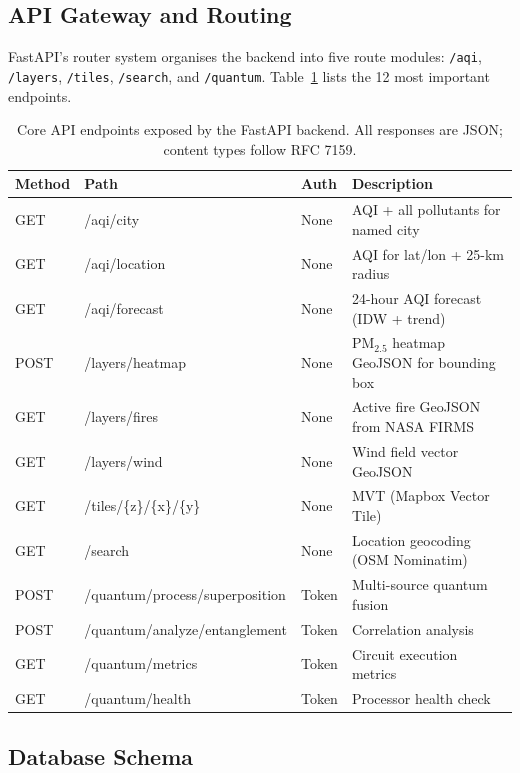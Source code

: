 \documentclass[12pt,a4paper]{article}
\begin{document}
\subsection{API Gateway and Routing}
\label{sec:sysdesign:gateway}

FastAPI's router system organises the backend into five route modules:
\texttt{/aqi}, \texttt{/layers}, \texttt{/tiles}, \texttt{/search}, and
\texttt{/quantum}. Table~\ref{tab:endpoints} lists the 12 most important
endpoints.

\begin{table}[H]
\centering
\caption[Core API endpoints]{Core API endpoints exposed by the FastAPI backend.
All responses are JSON; content types follow RFC 7159.}
\label{tab:endpoints}
\begin{tabular}{@{}lllp{5.5cm}@{}}
\toprule
\textbf{Method} & \textbf{Path} & \textbf{Auth} & \textbf{Description} \\
\midrule
GET  & /aqi/city      & None  & AQI + all pollutants for named city \\
GET  & /aqi/location  & None  & AQI for lat/lon + 25-km radius \\
GET  & /aqi/forecast  & None  & 24-hour AQI forecast (IDW + trend) \\
POST & /layers/heatmap & None & PM$_{2.5}$ heatmap GeoJSON for bounding box \\
GET  & /layers/fires  & None  & Active fire GeoJSON from NASA FIRMS \\
GET  & /layers/wind   & None  & Wind field vector GeoJSON \\
GET  & /tiles/\{z\}/\{x\}/\{y\} & None & MVT (Mapbox Vector Tile) \\
GET  & /search        & None  & Location geocoding (OSM Nominatim) \\
POST & /quantum/process/superposition & Token & Multi-source quantum fusion \\
POST & /quantum/analyze/entanglement  & Token & Correlation analysis \\
GET  & /quantum/metrics               & Token & Circuit execution metrics \\
GET  & /quantum/health                & Token & Processor health check \\
\bottomrule
\end{tabular}
\end{table}

\subsection{Database Schema}
\label{sec:sysdesign:db}
\end{document}
